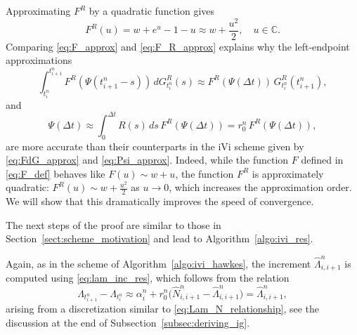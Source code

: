 \documentclass{article}
\newcommand{\1}{\mathbbm{1}}
\newcommand{\Dim}{\color{purple}}
\numberwithin{equation}{section}
\begin{document}
Approximating $F^R$ by a quadratic function gives
\begin{equation}\label{eq:F_R_approx}
    F^R(u) = w + e^{u} - 1 - u \approx w + \frac{u^2}{2}, \quad u \in \mathbb{C}.
\end{equation}
Comparing \eqref{eq:F_approx} and \eqref{eq:F_R_approx} explains why the left-endpoint approximations
\[
\int_{t^n_i}^{t^n_{i+1}} F^R(\Psi(t^n_{i+1} - s))\,dG^R_{t^n_i}(s) \approx F^R(\Psi(\Delta t))\,G_{t^n_i}^R(t^n_{i+1}),
\]
and
\[
\Psi(\Delta t) \approx \int_0^{\Delta t} R(s)\,ds\,F^R(\Psi(\Delta t)) = r_0^n\,F^R(\Psi(\Delta t)),
\]
are more accurate than their counterparts in the iVi scheme given by \eqref{eq:FdG_approx} and \eqref{eq:Psi_approx}. Indeed, while the function $F$ defined in \eqref{eq:F_def} behaves like $F(u) \sim w + u$, the function $F^R$ is approximately quadratic: $F^R(u) \sim w + \frac{u^2}{2}$ as $u \to 0$, which increases the approximation order. We will show that this dramatically improves the speed of convergence.

The next steps of the proof are similar to those in Section~\ref{sect:scheme_motivation} and lead to Algorithm~\ref{algo:ivi_res}.

Again, as in the scheme of Algorithm~\ref{algo:ivi_hawkes}, 
the increment $\widehat{\Lambda}^n_{i,i+1}$ is computed using \eqref{eq:lam_inc_res}, 
which follows from the relation
\[
\Lambda_{t^n_{i+1}} - \Lambda_{t^n_i} 
\approx \alpha^n_i + r_0^n \bigl(\widehat{N}^n_{i,i+1} - \widehat{\Lambda}^n_{i,i+1}\bigr) 
= \widehat{\Lambda}^n_{i,i+1},
\]
arising from a discretization similar to \eqref{eq:Lam_N_relationship}, see the discussion at the end of Subsection~\ref{subsec:deriving_ig}.

\end{document}
